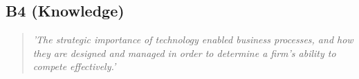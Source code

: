 \subsection{B4 (Knowledge)}

  \begin{quote}
    \textit{'The strategic importance of technology
    enabled business processes, and how they are designed
    and managed in order to determine a firm’s ability to
    compete effectively.'}
  \end{quote}

\newpage